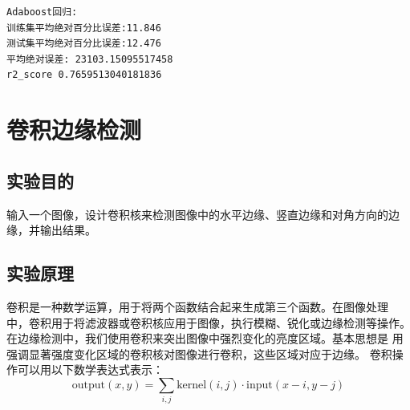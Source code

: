 \documentclass[a4paper,12pt]{article}
\begin{document}
\begin{lstlisting}
Adaboost回归:
训练集平均绝对百分比误差:11.846
测试集平均绝对百分比误差:12.476
平均绝对误差: 23103.15095517458
r2_score 0.7659513040181836
\end{lstlisting}

\newpage
\section{卷积边缘检测}
\subsection{实验目的}
输入一个图像，设计卷积核来检测图像中的水平边缘、竖直边缘和对角方向的边缘，并输出结果。
\subsection{实验原理}
卷积是一种数学运算，用于将两个函数结合起来生成第三个函数。在图像处理
中，卷积用于将滤波器或卷积核应用于图像，执行模糊、锐化或边缘检测等操作。
在边缘检测中，我们使用卷积来突出图像中强烈变化的亮度区域。基本思想是
用强调显著强度变化区域的卷积核对图像进行卷积，这些区域对应于边缘。
卷积操作可以用以下数学表达式表示：
\begin{equation}
\text{output}(x, y) = \sum_{i, j} \text{kernel}(i, j) \cdot \text{input}(x - i, y - j)
\end{equation}
\end{document}

